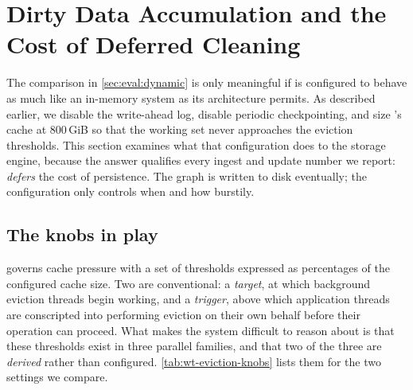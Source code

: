 \section{Dirty Data Accumulation and the Cost of Deferred Cleaning}
\label{sec:eval:dynamic:dirty}

The comparison in \autoref{sec:eval:dynamic} is only meaningful if \project{} is configured to behave as much like an in-memory system as its architecture permits.
As described earlier, we disable the write-ahead log, disable periodic checkpointing, and size \wt{}'s cache at 800\,GiB so that the working set never approaches the eviction thresholds.
This section examines what that configuration does to the storage engine, because the answer qualifies every ingest and update number we report: \project{} \emph{defers} the cost of persistence.
The graph is written to disk eventually; the configuration only controls when and how burstily.

\subsection{The knobs in play}
\label{sec:eval:dynamic:dirty:knobs}

\wt{} governs cache pressure with a set of thresholds expressed as percentages of the configured cache size.
Two are conventional: a \emph{target}, at which background eviction threads begin working, and a \emph{trigger}, above which application threads are conscripted into performing eviction on their own behalf before their operation can proceed.
What makes the system difficult to reason about is that these thresholds exist in three parallel families, and that two of the three are \emph{derived} rather than configured.
\autoref{tab:wt-eviction-knobs} lists them for the two settings we compare.

